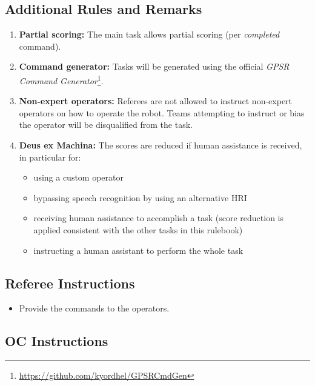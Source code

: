 \subsection*{Additional Rules and Remarks}
\begin{enumerate}[nosep]
	\item \textbf{Partial scoring:} The main task allows partial scoring (per \emph{completed} command).

	\item \textbf{Command generator:} Tasks will be generated using the official \emph{GPSR Command Generator}\footnote{\url{https://github.com/kyordhel/GPSRCmdGen}}.

	\item \textbf{Non-expert operators:} Referees are not allowed to instruct non-expert operators on how to operate the robot.
	Teams attempting to instruct or bias the operator will be disqualified from the task.

	\item \textbf{Deus ex Machina:} The scores are reduced if human assistance is received, in particular for:
	\begin{itemize}
		\item using a custom operator
		\item bypassing speech recognition by using an alternative HRI
		\item receiving human assistance to accomplish a task (score reduction is applied consistent with the other tasks in this rulebook)
		\item instructing a human assistant to perform the whole task
	\end{itemize}
\end{enumerate}

\subsection*{Referee Instructions}
\begin{itemize}[nosep]
	\item Provide the commands to the operators.
\end{itemize}

\subsection*{OC Instructions}

